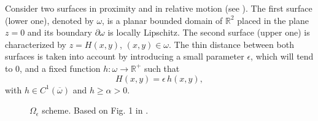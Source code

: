 Consider two surfaces in proximity and in relative motion (see ). The first surface (lower one), denoted by $\omega$, is a planar bounded domain of $\mathbb{R}^2$ placed in the plane $z=0$ and its boundary $\partial \omega$ is locally Lipschitz. The second surface (upper one) is characterized by $z=H(x,y)$, $(x,y)\in \omega$. The thin distance between both surfaces is taken into account by introducing a small parameter $\epsilon$, which will tend to $0$, and a fixed function $h:\omega\rightarrow \mathbb{R}^+$ such that $$H(x,y)=\epsilon \,h(x,y),$$
with $h\in C^1(\overline{\omega})$ and $h\geq \alpha >0$. 
 \begin{figure}[h]
 \centering 
 \def\svgwidth{\textwidth}	

\caption[Domain dependent on $\epsilon$ for studying the convergence of Stokes system solutions.]{$\Omega_\epsilon$ scheme. Based on Fig. 1 in \cite{chambat1986}.}\label{fig:bayadachambat_scheme}
\end{figure}


